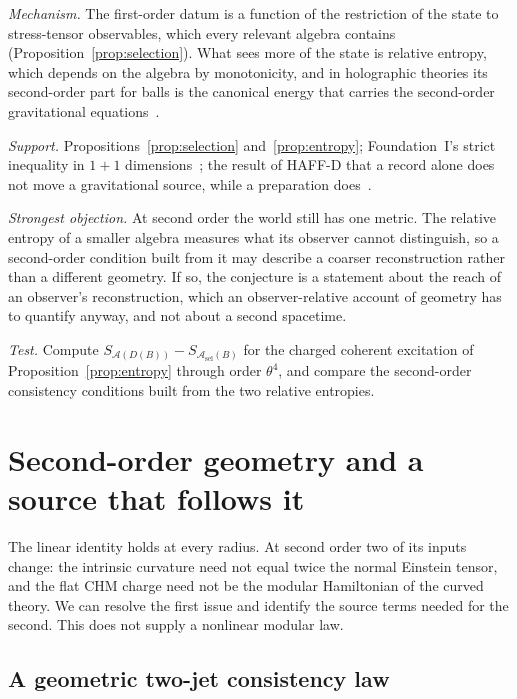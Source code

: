 \documentclass[12pt]{article}
\theoremstyle{definition}
\theoremstyle{remark}
\begin{document}
\emph{Mechanism.} The first-order datum is a function of the restriction of the state to
stress-tensor observables, which every relevant algebra contains
(Proposition~\ref{prop:selection}). What sees more of the state is relative entropy, which
depends on the algebra by monotonicity, and in holographic theories its second-order part
for balls is the canonical energy that carries the second-order gravitational
equations~\cite{LashkariVanRaamsdonk2016,FHHPRV2017}.

\emph{Support.} Propositions~\ref{prop:selection} and~\ref{prop:entropy}; Foundation~I's
strict inequality in \(1+1\) dimensions~\cite{FoundationI}; the result of HAFF-D that a
record alone does not move a gravitational source, while a preparation
does~\cite{HAFFD}.

\emph{Strongest objection.} At second order the world still has one metric. The relative
entropy of a smaller algebra measures what its observer cannot distinguish, so a
second-order condition built from it may describe a coarser reconstruction rather than a
different geometry. If so, the conjecture is a statement about the reach of an observer's
reconstruction, which an observer-relative account of geometry has to quantify anyway,
and not about a second spacetime.

\emph{Test.} Compute \(S_{\mathcal A(D(B))}-S_{\mathcal A_{\mathrm{sel}}(B)}\) for the charged
coherent excitation of Proposition~\ref{prop:entropy} through order \(\theta^4\), and compare
the second-order consistency conditions built from the two relative entropies.

\section{Second-order geometry and a source that follows it}
\label{sec:secondorder}

The linear identity holds at every radius. At second order two of its
inputs change: the intrinsic curvature need not equal twice the normal
Einstein tensor, and the flat CHM charge need not be the modular Hamiltonian
of the curved theory. We can resolve the first issue and identify the source
terms needed for the second. This does not supply a nonlinear modular law.

\subsection{A geometric two-jet consistency law}
\end{document}
